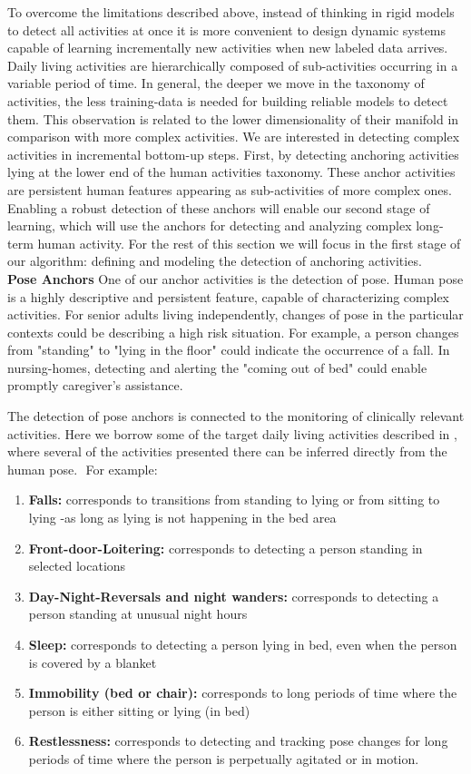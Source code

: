 \documentclass[oneside, twocolumn]{article}
\begin{document}
To overcome the limitations described above, instead of thinking in rigid models to detect all activities at once it is more convenient to design dynamic systems capable of learning incrementally new activities when new labeled data arrives.  Daily living activities are hierarchically composed of sub-activities occurring in a variable period of time. In general, the deeper we move in the taxonomy of activities, the less training-data is needed for building reliable models to detect them. This observation is related to the lower dimensionality of their manifold in comparison with more complex activities. We are interested in detecting complex activities in incremental bottom-up steps. First, by detecting anchoring activities lying at the lower end of the human activities taxonomy. These anchor activities are persistent human features appearing as sub-activities of more complex ones.  Enabling a robust detection of these anchors will enable our second stage of learning, which will use the anchors for detecting and analyzing complex long-term human activity.  For the rest of this section we will focus in the first stage of our algorithm: defining and modeling the detection of anchoring activities.\\

\textbf{Pose Anchors} One of our anchor activities is the detection of pose. Human pose  is a highly descriptive and persistent feature, capable  of  characterizing complex activities. For senior adults living independently, changes of pose in the particular contexts could be describing a high risk situation. For  example,  a person changes from "standing" to "lying in the floor" could indicate the  occurrence  of a fall. In nursing-homes, detecting and alerting the "coming out of bed" could enable promptly caregiver's assistance.

The detection of pose anchors is connected to the monitoring of clinically relevant activities. Here we borrow some of the target daily living  activities  described in \cite{pac_stanford}, where several of the activities presented there can be inferred directly from the human pose.
​
For example:
\begin{enumerate}
	\item \textbf{Falls:} corresponds to transitions from standing to lying or from sitting to lying -as long as lying is not happening in the bed area
	\item \textbf{Front-door-Loitering:} corresponds to detecting a person standing in selected locations
	\item \textbf{Day-Night-Reversals and night wanders:} corresponds to detecting a person standing at unusual night hours
	\item \textbf{Sleep:} corresponds to detecting a person lying in bed, even when the person is covered by a blanket
	\item \textbf{Immobility (bed or chair):} corresponds to long periods of time where the person is either sitting or lying (in bed)
	\item \textbf{Restlessness:} corresponds to detecting and tracking pose changes for long periods of time where the person is perpetually agitated or in motion.
\end{enumerate}
\end{document}
